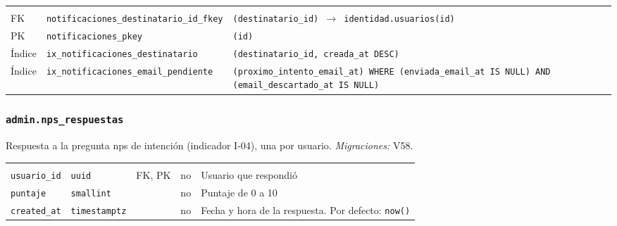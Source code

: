 {\small
\begin{xltabular}{\textwidth}{@{}>{\raggedright\arraybackslash}p{1.7cm} >{\raggedright\arraybackslash}p{4.6cm} L@{}}
    \toprule
     &  &  \\
    \midrule
    \endfirsthead
    \toprule
     &  &  \\
    \midrule
    \endhead
    \bottomrule
    \endfoot
    FK & \texttt{notificaciones\_\allowbreak{}destinatario\_\allowbreak{}id\_\allowbreak{}fkey} & \texttt{(\allowbreak{}destinatario\_\allowbreak{}id) $\rightarrow$ identidad.usuarios(\allowbreak{}id)} \\
    PK & \texttt{notificaciones\_\allowbreak{}pkey} & \texttt{(\allowbreak{}id)} \\
    Índice & \texttt{ix\_\allowbreak{}notificaciones\_\allowbreak{}destinatario} & \texttt{(\allowbreak{}destinatario\_\allowbreak{}id,\allowbreak{} creada\_\allowbreak{}at DESC)} \\
    Índice & \texttt{ix\_\allowbreak{}notificaciones\_\allowbreak{}email\_\allowbreak{}pendiente} & \texttt{(\allowbreak{}proximo\_\allowbreak{}intento\_\allowbreak{}email\_\allowbreak{}at) WHERE (\allowbreak{}enviada\_\allowbreak{}email\_\allowbreak{}at IS NULL) AND (\allowbreak{}email\_\allowbreak{}descartado\_\allowbreak{}at IS NULL)} \\
\end{xltabular}
}

\subsubsection{\texorpdfstring{\texttt{admin.nps\_\allowbreak{}respuestas}}{admin.nps\_respuestas}}\label{dd:admin.nps_respuestas}

Respuesta a la pregunta \gls{nps} de intención (indicador I-04), una por usuario. \emph{Migraciones:} V58.

{\small
\begin{xltabular}{\textwidth}{@{}>{\raggedright\arraybackslash}p{3.6cm} >{\raggedright\arraybackslash}p{2.3cm} >{\raggedright\arraybackslash}p{1cm} >{\centering\arraybackslash}p{0.85cm} L@{}}
    \toprule
     &  &  &  &  \\
    \midrule
    \endfirsthead
    \toprule
     &  &  &  &  \\
    \midrule
    \endhead
    \bottomrule
    \endfoot
    \texttt{usuario\_\allowbreak{}id} & \texttt{uuid} & FK, PK & no & Usuario que respondió \\
    \texttt{puntaje} & \texttt{smallint} &  & no & Puntaje de 0 a 10 \\
    \texttt{created\_\allowbreak{}at} & \texttt{timestamptz} &  & no & Fecha y hora de la respuesta. Por defecto: \texttt{now(\allowbreak{})} \\
\end{xltabular}
}

